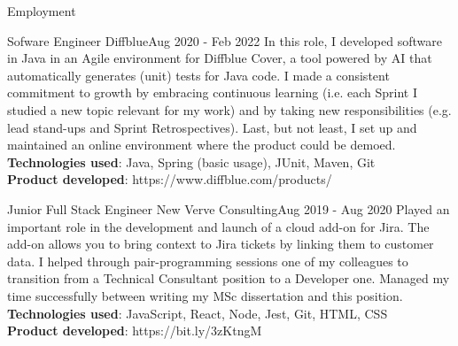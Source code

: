 \documentclass[]{mcdowellcv}
\begin{document}
\begin{cvsection}{Employment}
   	    \begin{cvsubsection}{Sofware Engineer }{Diffblue}{Aug 2020 - Feb 2022 }
			\hspace{\parindent} \hspace{\parindent} \hspace{\parindent} \hspace{\parindent} In this role, I developed software in Java in an Agile environment for Diffblue Cover, a tool powered by AI that automatically generates (unit) tests for Java code. I made a consistent commitment to growth by embracing continuous learning (i.e. each Sprint I studied a new topic relevant for my work) and by taking new responsibilities (e.g. lead stand-ups and Sprint Retrospectives). Last, but not least, I set up and maintained an online environment where the product could be demoed.
      		\\ \textbf{Technologies used}: Java, Spring (basic usage), JUnit, Maven, Git
	  		\\ \textbf{Product developed}: https://www.diffblue.com/products/
		\end{cvsubsection}

		\begin{cvsubsection}{Junior Full Stack Engineer }{New Verve Consulting}{Aug 2019 - Aug 2020} 
			\hspace{\parindent} \hspace{\parindent} \hspace{\parindent} \hspace{\parindent} Played an important role in the development and launch of a cloud add-on for Jira. The add-on allows you to bring context to Jira tickets by linking them to customer data. I helped through pair-programming sessions one of my colleagues to transition from a Technical Consultant position to a Developer one. Managed my time successfully between writing my MSc dissertation and this position.
      		\\ \textbf{Technologies used}: JavaScript, React, Node, Jest, Git, HTML, CSS
	  		\\ \textbf{Product developed}: https://bit.ly/3zKtngM
		\end{cvsubsection}



\end{cvsection}
\end{document}
